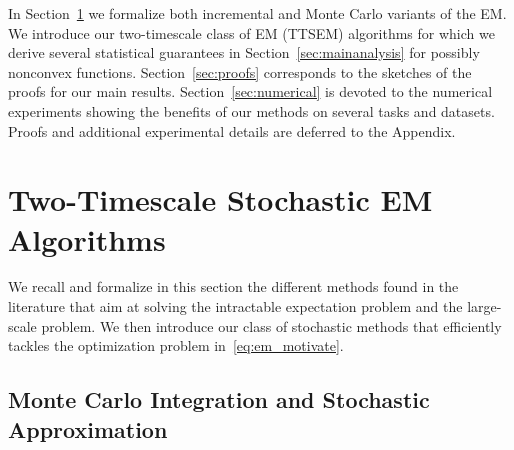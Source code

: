 \documentclass[bj]{imsart}
\numberwithin{equation}{section}
\theoremstyle{plain}
\begin{document}

In Section~\ref{sec:tts} we formalize both incremental and Monte Carlo variants of the EM. 
We introduce our two-timescale class of EM (TTSEM) algorithms for which we derive several statistical guarantees in Section~\ref{sec:mainanalysis} for possibly {nonconvex} functions.
Section~\ref{sec:proofs} corresponds to the sketches of the proofs for our main results.
Section~\ref{sec:numerical} is devoted to the numerical experiments showing the benefits of our methods on several tasks and datasets.
Proofs and additional experimental details are deferred to the Appendix.


\section{Two-Timescale Stochastic EM Algorithms}\label{sec:tts}


We recall and formalize in this section the different methods found in the literature that aim at solving the intractable expectation problem and the large-scale problem. 
We then introduce our class of stochastic methods that efficiently tackles the optimization problem in~\eqref{eq:em_motivate}.


\subsection{Monte Carlo Integration and Stochastic Approximation} 
\end{document}

